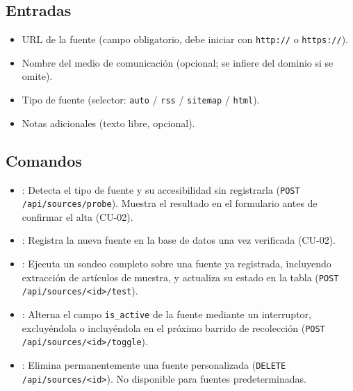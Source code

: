 \subsection{Entradas}
	\begin{itemize}
		\item URL de la fuente (campo obligatorio, debe iniciar con \texttt{http://} o
		      \texttt{https://}).
		\item Nombre del medio de comunicación (opcional; se infiere del dominio si se omite).
		\item Tipo de fuente (selector: \texttt{auto} / \texttt{rss} / \texttt{sitemap} /
		      \texttt{html}).
		\item Notas adicionales (texto libre, opcional).
	\end{itemize}

\subsection{Comandos}
	\begin{itemize}
		\item {}: Detecta el tipo de fuente y su accesibilidad sin
		      registrarla (\texttt{POST /api/sources/probe}). Muestra el resultado en el
		      formulario antes de confirmar el alta (CU-02).
		\item {}: Registra la nueva fuente en la base de datos una
		      vez verificada (CU-02).
		\item {}: Ejecuta un sondeo completo sobre una fuente ya
		      registrada, incluyendo extracción de artículos de muestra, y actualiza su
		      estado en la tabla (\texttt{POST /api/sources/<id>/test}).
		\item {}: Alterna el campo \texttt{is\_active} de
		      la fuente mediante un interruptor, excluyéndola o incluyéndola en el próximo
		      barrido de recolección (\texttt{POST /api/sources/<id>/toggle}).
		\item {}: Elimina permanentemente una fuente personalizada
		      (\texttt{DELETE /api/sources/<id>}). No disponible para fuentes predeterminadas.
	\end{itemize}
